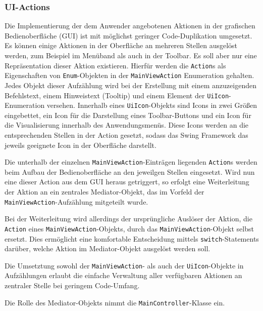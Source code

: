 \subsubsection{UI-Actions}
Die Implementierung der dem Anwender angebotenen Aktionen in der grafischen
Bedienoberfläche (GUI) ist mit möglichst geringer Code-Duplikation umgesetzt. Es
können einige Aktionen in der Oberfläche an mehreren Stellen ausgelöst werden,
zum Beispiel im Menüband als auch in der Toolbar. Es soll aber nur eine
Repräsentation dieser Aktion existieren. Hierfür werden die \texttt{Action}s als
Eigenschaften von \texttt{Enum}-Objekten in der \texttt{MainViewAction}
Enumeration gehalten. Jedes Objekt dieser Aufzählung wird bei der Erstellung mit
einem anzuzeigenden Befehlstext, einem Hinweistext (Tooltip) und einem Element
der \texttt{UiIcon}-Enumeration versehen. Innerhalb eines
\texttt{UiIcon}-Objekts sind Icons in zwei Größen eingebettet, ein Icon für die
Darstellung eines Toolbar-Buttons und ein Icon für die Visualisierung innerhalb
des Anwendungsmenüs. Diese Icons werden an die entsprechenden Stellen in der
Action gesetzt, sodass das Swing Framework das jeweils geeignete Icon in der
Oberfläche darstellt.

Die unterhalb der einzelnen \texttt{MainViewAction}-Einträgen liegenden
\texttt{Action}s werden beim Aufbau der Bedienoberfläche an den jeweilgen
Stellen eingesetzt. Wird nun eine dieser Action aus dem GUI heraus getriggert,
so erfolgt eine Weiterleitung der Aktion an ein zentrales Mediator-Objekt, das
im Vorfeld der \texttt{MainViewAction}-Aufzählung mitgeteilt wurde.

Bei der Weiterleitung wird allerdings der ursprüngliche Auslöser der Aktion, die
\texttt{Action} eines \texttt{MainViewAction}-Objekts, durch das
\texttt{MainViewAction}-Objekt selbst ersetzt. Dies ermöglicht eine komfortable
Entscheidung mittels \texttt{switch}-Statements darüber, welche Aktion im
Mediator-Objekt ausgelöst werden soll.

Die Umsetztung sowohl der \texttt{MainViewAction}- als auch der
\texttt{UiIcon}-Objekte in Aufzählungen erlaubt die einfache Verwaltung aller
verfügbaren Aktionen an zentraler Stelle bei geringem Code-Umfang.

Die Rolle des Mediator-Objekts nimmt die \texttt{MainController}-Klasse ein.